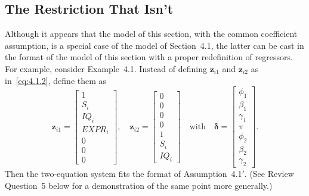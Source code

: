 \subsection*{The Restriction That Isn't}

Although it appears that the model of this section, with the common coefficient
assumption, is a special case of the model of Section~4.1, the latter can be cast in
the format of the model of this section with a proper redefinition of regressors.
For example, consider Example~4.1. Instead of defining $\mathbf{z}_{i1}$ and
$\mathbf{z}_{i2}$ as in~\eqref{eq:4.1.2}, define them as
\[
\mathbf{z}_{i1} = \begin{bmatrix}
1 \\ S_i \\ IQ_i \\ EXPR_i \\ 0 \\ 0 \\ 0
\end{bmatrix}, \quad
\mathbf{z}_{i2} = \begin{bmatrix}
0 \\ 0 \\ 0 \\ 0 \\ 1 \\ S_i \\ IQ_i
\end{bmatrix} \quad \text{with} \quad
\boldsymbol{\delta} = \begin{bmatrix}
\phi_1 \\ \beta_1 \\ \gamma_1 \\ \pi \\ \phi_2 \\ \beta_2 \\ \gamma_2
\end{bmatrix}.
\]
Then the two-equation system fits the format of Assumption~4.1$'$.
(See Review Question~5 below for a demonstration of the same point more generally.)

